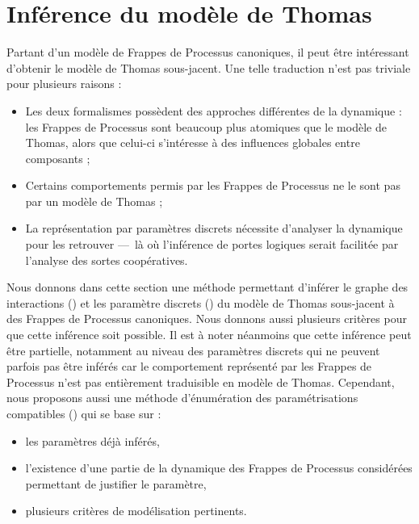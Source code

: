 
\section{Inférence du modèle de Thomas}

Partant d'un modèle de Frappes de Processus canoniques, il peut être intéressant
d'obtenir le modèle de Thomas sous-jacent.
Une telle traduction n'est pas triviale pour plusieurs raisons :
\begin{itemize}
  \item Les deux formalismes possèdent des approches différentes de la dynamique :
    les Frappes de Processus sont beaucoup plus atomiques que le modèle de Thomas,
    alors que celui-ci s'intéresse à des influences globales entre composants ;
  \item Certains comportements permis par les Frappes de Processus ne le sont
    pas par un modèle de Thomas ;
  \item La représentation par paramètres discrets nécessite d'analyser la dynamique
    pour les retrouver ---~là où l'inférence de portes logiques serait facilitée
    par l'analyse des sortes coopératives.
\end{itemize}

\myskip

Nous donnons dans cette section une méthode
permettant d'inférer le graphe des interactions ()
et les paramètre discrets ()
du modèle de Thomas sous-jacent à des Frappes de Processus canoniques.
Nous donnons aussi plusieurs critères pour que cette inférence soit possible.
Il est à noter néanmoins que cette inférence peut être partielle,
notamment au niveau des paramètres discrets qui ne peuvent parfois pas être inférés
car le comportement représenté par les Frappes de Processus n'est pas entièrement traduisible
en modèle de Thomas.
Cependant, nous proposons aussi une méthode d'énumération des paramétrisations compatibles
() qui se base sur :
\begin{itemize}
  \item les paramètres déjà inférés,
  \item l'existence d'une partie de la dynamique des Frappes de Processus considérées
    permettant de justifier le paramètre,
  \item plusieurs critères de modélisation pertinents.
\end{itemize}

